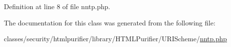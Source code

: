 Definition at line 8 of file nntp.\+php.



The documentation for this class was generated from the following file\+:\begin{DoxyCompactItemize}
\item 
classes/security/htmlpurifier/library/\+H\+T\+M\+L\+Purifier/\+U\+R\+I\+Scheme/\hyperlink{nntp_8php}{nntp.\+php}\end{DoxyCompactItemize}
